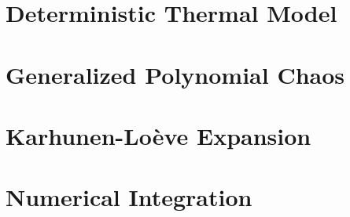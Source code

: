 \renewcommand{\thesection}{S\arabic{section}}
\renewcommand{\thetable}{S\arabic{table}}
\renewcommand{\thefigure}{S\arabic{figure}}
\setcounter{table}{0}
\setcounter{figure}{0}



\section{Deterministic Thermal Model} 


\section{Generalized Polynomial Chaos}   


\balance

\section{Karhunen-Lo\`{e}ve Expansion} 


\section{Numerical Integration} 

